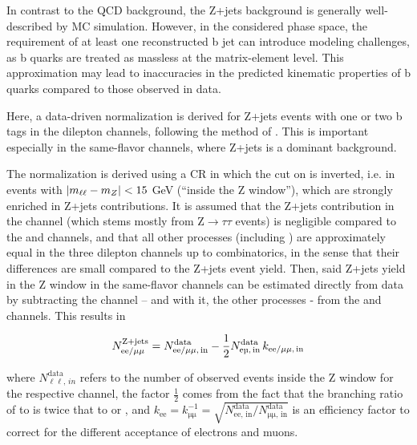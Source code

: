 In contrast to the QCD background, the Z+jets background is generally well-described by MC simulation. 
However, in the considered phase space, the requirement of at least one reconstructed b jet can introduce modeling challenges, as b quarks are treated as massless at the matrix-element level. This approximation may lead to inaccuracies in the predicted kinematic properties of b quarks compared to those observed in data.

Here, a data-driven normalization is derived for Z+jets events with one or two b tags in the dilepton channels, following the method of . This is important especially in the same-flavor channels, where Z+jets is a dominant background.

The normalization is derived using a CR in which the cut on \mll is inverted, i.e. in events with $| m_{\ell\ell} - m_Z | < 15$ GeV (``inside the Z window''), which are strongly enriched in Z+jets contributions. It is assumed that the Z+jets contribution in the \emu channel (which stems mostly from $\mathrm{Z} \rightarrow \tau \tau$ events) is negligible compared to the \ee and \mumu channels, and that all other processes (including \ttbar) are approximately equal in the three dilepton channels up to combinatorics, in the sense that their differences are small compared to the Z+jets event yield. Then, said Z+jets yield in the Z window in the same-flavor channels can be estimated directly from data by subtracting the \emu channel -- and with it, the other processes - from the \ee and \mumu channels. This results in

\begin{equation}
\label{eq:ttxs:zjets_yield}
    N_{\mathrm{ee / \mu\mu}}^{\mathrm{Z+jets}} = N_{\mathrm{ee / \mu\mu,\,in}}^{\mathrm{data}} - \frac{1}{2} N_{\mathrm{\emu,\,in}}^{\mathrm{data}} \, k_{\mathrm{ee / \mu\mu,\,in}}
\end{equation}

\noindent where $N_{\mathrm{\ell \ell},\,in}^{\mathrm{data}}$ refers to the number of observed events inside the Z window for the respective channel, the factor $\frac{1}{2}$ comes from the fact that the branching ratio of \ttbar to \emu is twice that to \ee or \mumu, and $k_{\mathrm{ee}} = k_{\mathrm{\mu\mu}}^{-1} = \sqrt{N_{\mathrm{ee,\,in}}^{\mathrm{data}} / N_{\mathrm{\mu\mu,\,in}}^{\mathrm{data}}}$ is an efficiency factor to correct for the different acceptance of electrons and muons.

